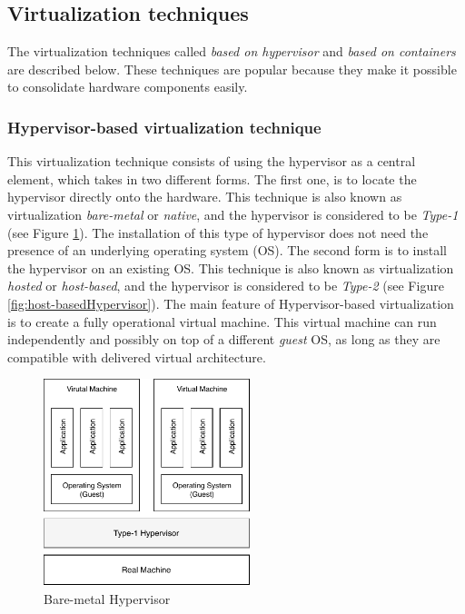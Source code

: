 	\subsection{Virtualization techniques}
	
	The virtualization techniques called \textit{based on hypervisor} and \textit {based on containers} are described below. 
	These techniques are popular because they make it possible to consolidate hardware components easily.
	
	\subsubsection{Hypervisor-based virtualization technique}
	
	This virtualization technique consists of using the hypervisor as a central element, which takes in two different forms. The first one, is to locate the hypervisor directly onto the hardware. 
	This technique is also known as virtualization \textit{bare-metal} or \textit{native}, and the hypervisor is considered to be \textit{Type-1} (see Figure \ref{fig:Bare-metalHypervisor}). 
	The installation of this type of hypervisor does not need the presence of an underlying operating system (OS). The second  form is to install the hypervisor on an existing OS. 
	This technique is also known as virtualization \textit{hosted} or \textit{host-based}, and the hypervisor is considered to be \textit{Type-2} (see Figure \ref{fig:host-basedHypervisor}). 
	The main feature of Hypervisor-based virtualization is to create a fully operational virtual machine. This virtual machine can run independently and possibly on top of a different \textit{guest} OS, as long as they are compatible with delivered virtual architecture.

	\begin{figure}[H]
		\centering
		\includegraphics[width=6cm]{images/bare-metalHypervisor.pdf}
		\vspace{-0.2cm}
		\caption{Bare-metal Hypervisor}
		\label{fig:Bare-metalHypervisor}
	\end{figure}
	

